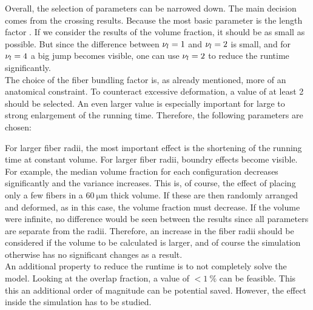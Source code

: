 Overall, the selection of parameters can be narrowed down.
The main decision comes from the crossing results.
Because the most basic parameter is the length factor \segLengthFactor{}.
If we consider the results of the volume fraction, it should be as small as possible.
But since the difference between $\textnormal{$\nu_{l}$}=\SI{1}{}$ and $\textnormal{$\nu_{l}$}=\SI{2}{}$ is small, and for $\textnormal{$\nu_{l}$}=\SI{4}{}$ a big jump becomes visible, one can use $\textnormal{$\nu_{l}$}=\SI{2}{}$ to reduce the runtime significantly.
\\
% 
The choice of the fiber bundling factor \segRadiusFactor{} is, as already mentioned, more of an anatomical constraint.
To counteract excessive deformation, a value of at least 2 should be selected.
An even larger value is especially important for large \segLengthFactor{} to strong enlargement of the running time.
Therefore, the following parameters are chosen:
% 
\begin{table}[H]
%
\centering
\end{table}
% 
For larger fiber radii, the most important effect is the shortening of the running time at constant volume.
For larger fiber radii, boundry effects become visible.
For example, the median volume fraction for each configuration decreases significantly and the variance increases.
This is, of course, the effect of placing only a few fibers in a $\SI{60}{\micro\meter}$ thick volume.
If these are then randomly arranged and deformed, as in this case, the volume fraction must decrease.
If the volume were infinite, no difference would be seen between the results since all parameters are separate from the radii.
Therefore, an increase in the fiber radii should be considered if the volume to be calculated is larger, and of course the simulation otherwise has no significant changes as a result.
\\
% 
An additional property to reduce the runtime is to not completely solve the model. 
Looking at the overlap fraction, a value of $<\SI{1}{\percent}$ can be feasible.
This this an additional order of magnitude can be potential saved.
However, the effect inside the simulation has to be studied.
% 
% 
% 
